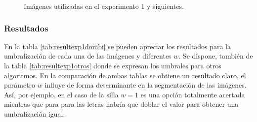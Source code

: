 \begin{figure}
    \quad
    \caption{Imágenes utilizadas en el experimento 1 y siguientes.}
    \label{fig:imagenes}
\end{figure}


\subsubsection{Resultados}
En la tabla \ref{tab:resultexp1dombi} se pueden apreciar los resultados para la umbralización de cada una de las imágenes y diferentes $w$. Se dispone, también de la tabla \ref{tab:resultexp1otros} donde se expresan los umbrales para otros algoritmos. En la comparación de ambas tablas se obtiene un resultado claro, el parámetro $w$ influye de forma determinante en la segmentación de las imágenes. Así, por ejemplo, en el caso de la silla $w=1$ es una opción totalmente acertada mientras que para para las letras habría que doblar el valor para obtener una umbralización igual.


